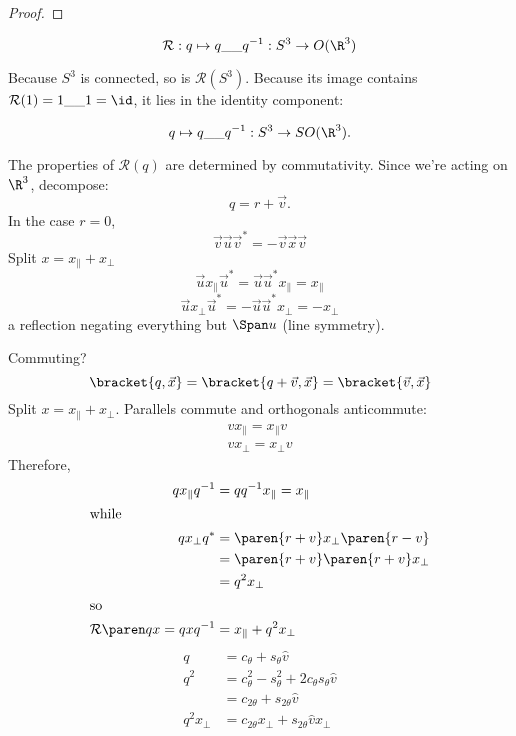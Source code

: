 \documentclass{scrartcl}
\newcommand{\SO}{SO}
\renewcommand{\O}{O}
\renewcommand{\blank}{\_\_}
\newcommand{\qrot}{\mathcal R}
\begin{document}
\begin{multicols*}{2}
\begin{proof}
  \end{proof}
  \begin{cor}
    \[
      \qrot: q\mapsto q\blank q^{-1}: S^3\to \O(\R^3)
    \]
  \end{cor}
  Because \(S^3\) is connected, so is \(\qrot(S^3)\). Because its image contains \(\qrot(1) = 1\blank 1 = \id\), it lies in the identity component:
  \begin{cor}
    \[
      q\mapsto q\blank q^{-1}: S^3\to \SO(\R^3).
    \]
  \end{cor}

  The properties of \(\qrot(q)\) are determined by commutativity.  Since we're acting on \(\R^3\), decompose:
  \[
    q = r + \vec v.
  \]
  In the case \(r=0\),
  \[
    \vec v \vec u \vec v^{*} = -\vec v \vec x \vec v
  \]
  Split \(x=x_\parallel + x_\perp\)
  \[
    \vec u x_\parallel \vec u^* = \vec u \vec u^{*} x_\parallel = x_\parallel
  \]
  \[
    \vec u x_\perp \vec u^* = -\vec u \vec u^{*} x_\perp = -x_\perp
  \]
  a reflection negating everything but \(\Span u\) (line symmetry).

  Commuting?
  \[
    \bracket{q,\vec x} = \bracket{q+\vec v, \vec x} = \bracket{\vec v, \vec x}
  \]
  Split \(x=x_\parallel+x_\perp\). Parallels commute and orthogonals anticommute:
  \begin{align*}
    v x_\parallel = x_\parallel v  \\
    v x_\perp = x_\perp v
  \end{align*}
  Therefore,
  \begin{align*}
    q x_\parallel q^{-1} &= qq^{-1}x_\parallel = x_\parallel \\
    \shortintertext{while}
    q x_\perp q^* &= \paren{r+ v}x_\perp \paren{r- v} \\
                  &=  \paren{r+ v}\paren{r+v}x_\perp \\
    &= q^2 x_\perp \\
      \shortintertext{so}
    \qrot\paren q x = qxq^{-1} &= x_\parallel + q^2 x_\perp
  \end{align*}
  \begin{align*}
    q &= c_\theta + s_\theta \hat v\\
    q^2 &= c_\theta^2 - s_\theta^2  + 2c_\theta s_\theta \hat v \\
      &= c_{2\theta} + s_{2\theta} \hat v \\
    q^2 x_\perp &= c_{2\theta} x_\perp + s_{2\theta}\hat v x_\perp
  \end{align*}



\end{multicols*}
\end{document}
